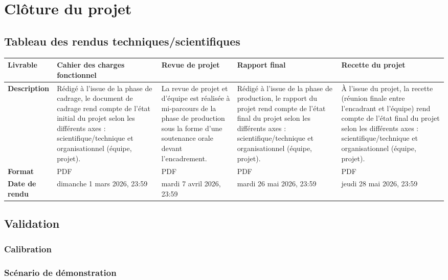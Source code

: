 \documentclass[10pt]{article} %
\begin{document}
 

\section{Clôture du projet}

\subsection{Tableau des rendus techniques/scientifiques}

\begin{tabularx}{\textwidth}{|>{\raggedright\arraybackslash}p{2.8cm}|X|X|X|X|}
\hline
\textbf{Livrable} & \textbf{Cahier des charges fonctionnel} & \textbf{Revue de projet} & \textbf{Rapport final} & \textbf{Recette du projet} \\
\hline
\textbf{Description} &
Rédigé à l’issue de la phase de cadrage, le document de cadrage rend compte de l’état initial du projet selon les différents axes : scientifique/technique et organisationnel (équipe, projet). & 
La revue de projet et d'équipe est réalisée à mi-parcours de la phase de production sous la forme d'une soutenance orale devant l'encadrement. & 
Rédigé à l’issue de la phase de production, le rapport du projet rend compte de l’état final du projet selon les différents axes : scientifique/technique et organisationnel (équipe, projet). & 
À l’issue du projet, la recette (réunion finale entre l'encadrant et l'équipe) rend compte de l’état final du projet selon les différents axes : scientifique/technique et organisationnel (équipe, projet). \\
\hline
\textbf{Format} & PDF & PDF & PDF & PDF \\
\hline
\textbf{Date de rendu} & dimanche 1 mars 2026, 23:59 & mardi 7 avril 2026, 23:59 & mardi 26 mai 2026, 23:59 & jeudi 28 mai 2026, 23:59 \\
\hline
\end{tabularx}

\subsection{Validation}

\subsubsection{Calibration}

\subsubsection*{Scénario de démonstration}
\end{document}
